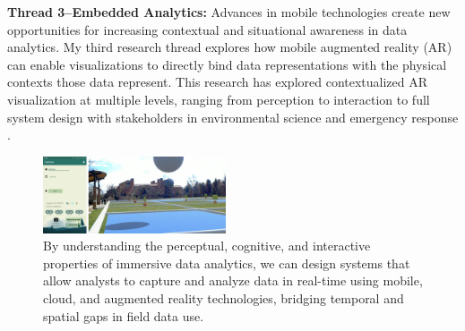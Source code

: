\documentclass[11pt]{article}
\begin{document}


\textbf{Thread 3--Embedded Analytics: }
Advances in mobile technologies create new opportunities for increasing contextual and situational awareness in data analytics. My third research thread explores how mobile augmented reality (AR) can enable visualizations to directly bind data representations with the physical contexts those data represent. 
This research has explored contextualized AR visualization at multiple levels, ranging from perception \cite{diaz2017designing} to interaction \cite{whitlock2018Distal} to full system design with stakeholders in environmental science and emergency response \cite{whitlock2019}. 

\begin{figure}
	\begin{center}
		\includegraphics[width=0.48\textwidth]{fieldview}
	\end{center}
	\caption{By understanding the perceptual, cognitive, and interactive properties of immersive data analytics, we can design systems that allow analysts to capture and analyze data in real-time using mobile, cloud, and augmented reality technologies, bridging temporal and spatial gaps in field data use.}\label{fieldview}
\end{figure}
\end{document}
